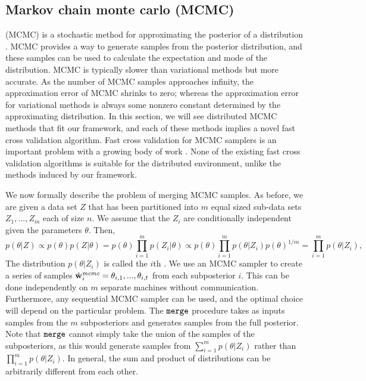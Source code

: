 \documentclass[thesis.tex]{subfiles}
\newcommand{\merge}{\mkprocedure{merge}}
\newcommand{\wmcmc}{\hat\w^\textit{mcmc}}
\newcommand\sample[2]{\theta_{{#1},{#2}}}
\begin{document}

\subsection{Markov chain monte carlo (MCMC)}
\label{sec:merge:mcmc}

 (MCMC) is a stochastic method for approximating the posterior of a distribution \citep[e.g.][]{andrieu2003introduction}.
MCMC provides a way to generate samples from the posterior distribution,
and these samples can be used to calculate the expectation and mode of the distribution.
MCMC is typically slower than variational methods but more accurate.
As the number of MCMC samples approaches infinity,
the approximation error of MCMC shrinks to zero;
whereas the approximation error for variational methods is always some nonzero constant determined by the approximating distribution.
In this section, we will see \fixme{} distributed MCMC methods that fit our framework,
and each of these methods implies a novel fast cross validation algorithm.
Fast cross validation for MCMC samplers is an important problem with a growing body of work
\citep{marshall2003approximate,
bhattacharya2007importance,
bornn2010efficient,
held2010posterior,
vehtari2012survey,
li2016approximating}.
None of the existing fast cross validation algorithms is suitable for the distributed environment,
unlike the methods induced by our framework.

We now formally describe the problem of merging MCMC samples.
As before, we are given a data set $Z$ that has been partitioned into $m$ equal sized sub-data sets $Z_1,...,Z_m$ each of size $n$.
We assume that the $Z_i$ are conditionally independent given the parameters $\theta$.
Then,
\begin{equation}
    p(\theta|Z) 
    \propto p(\theta)p(Z|\theta)
    = p(\theta)\prod_{i=1}^m p(Z_i|\theta)
    \propto p(\theta)\prod_{i=1}^m p(\theta|Z_i)p(\theta)^{1/m}
    = \prod_{i=1}^m p(\theta|Z_i)
    ,
\end{equation}
The distribution $p(\theta|Z_i)$ is called the $i$th .
We use an MCMC sampler to create a series of samples $\wmcmc_i=\sample{i}{1},...,\sample{i}{t}$ from each subposterior $i$.
This can be done independently on $m$ separate machines without communication.
Furthermore, any sequential MCMC sampler can be used,
and the optimal choice will depend on the particular problem.
The $\merge$ procedure takes as inputs samples from the $m$ subposteriors and generates samples from the full posterior.
Note that $\merge$ cannot simply take the union of the samples of the subposteriors,
as this would generate samples from $\sum_{i=1}^mp(\theta|Z_i)$ rather than $\prod_{i=1}^m p(\theta|Z_i)$.
In general, the sum and product of distributions can be arbitrarily different from each other.
\end{document}
